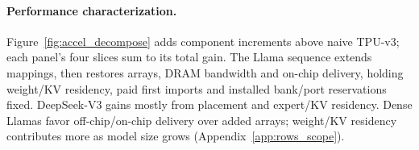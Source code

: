 \paragraph{Performance characterization.}
Figure~\ref{fig:accel_decompose} adds component increments above naive TPU-v3;
each panel's four slices sum to its total gain. The Llama sequence extends mappings,
then restores arrays, DRAM bandwidth and on-chip delivery, holding weight/KV
residency, paid first imports and installed bank/port reservations fixed.
DeepSeek-V3 gains mostly from placement and expert/KV residency.
Dense Llamas favor off-chip/on-chip delivery over added arrays; weight/KV residency
contributes more as model size grows (Appendix~\ref{app:rows_scope}).
